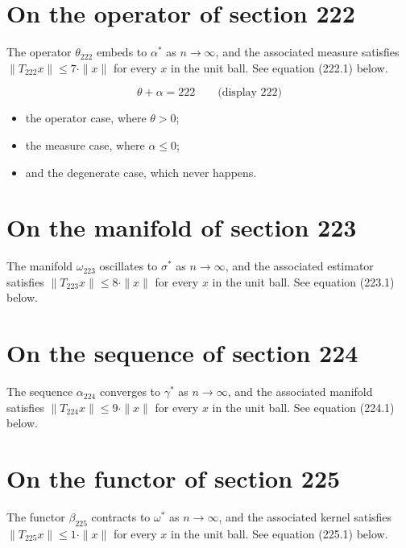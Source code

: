 \documentclass{article}
\begin{document}
\section{On the operator of section 222}
The operator $\theta_{222}$ embeds to $\alpha^{*}$ as $n \to \infty$,
and the associated measure satisfies $\|T_{222} x\| \leq 7 \cdot \|x\|$
for every $x$ in the unit ball. See equation (222.1) below.

$$
\theta + \alpha = 222 \qquad \text{(display 222)}
$$

\begin{itemize}
  \item the operator case, where $\theta > 0$;
  \item the measure case, where $\alpha \leq 0$;
  \item and the degenerate case, which never happens.
\end{itemize}

\section{On the manifold of section 223}
The manifold $\omega_{223}$ oscillates to $\sigma^{*}$ as $n \to \infty$,
and the associated estimator satisfies $\|T_{223} x\| \leq 8 \cdot \|x\|$
for every $x$ in the unit ball. See equation (223.1) below.

\section{On the sequence of section 224}
The sequence $\alpha_{224}$ converges to $\gamma^{*}$ as $n \to \infty$,
and the associated manifold satisfies $\|T_{224} x\| \leq 9 \cdot \|x\|$
for every $x$ in the unit ball. See equation (224.1) below.

\section{On the functor of section 225}
The functor $\beta_{225}$ contracts to $\omega^{*}$ as $n \to \infty$,
and the associated kernel satisfies $\|T_{225} x\| \leq 1 \cdot \|x\|$
for every $x$ in the unit ball. See equation (225.1) below.
\end{document}
